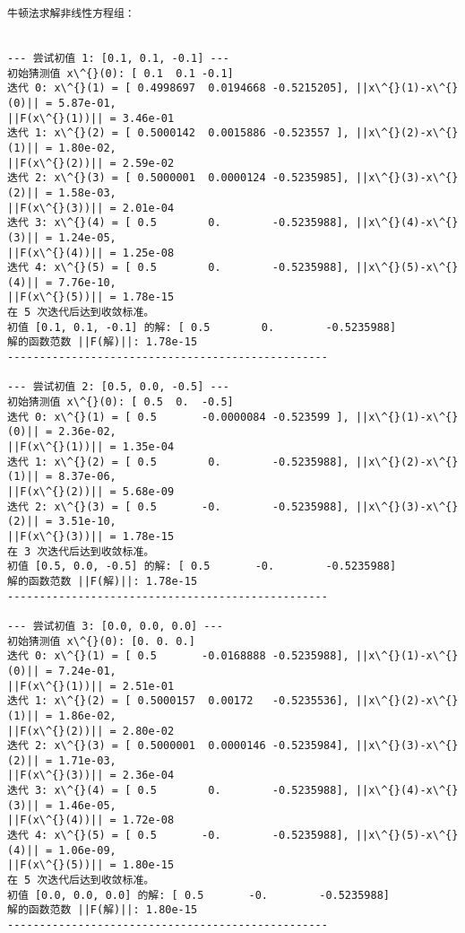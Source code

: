 \documentclass[11pt]{article}
\begin{document}
    \begin{Verbatim}[commandchars=\\\{\}]
牛顿法求解非线性方程组：


--- 尝试初值 1: [0.1, 0.1, -0.1] ---
初始猜测值 x\^{}(0): [ 0.1  0.1 -0.1]
迭代 0: x\^{}(1) = [ 0.4998697  0.0194668 -0.5215205], ||x\^{}(1)-x\^{}(0)|| = 5.87e-01,
||F(x\^{}(1))|| = 3.46e-01
迭代 1: x\^{}(2) = [ 0.5000142  0.0015886 -0.523557 ], ||x\^{}(2)-x\^{}(1)|| = 1.80e-02,
||F(x\^{}(2))|| = 2.59e-02
迭代 2: x\^{}(3) = [ 0.5000001  0.0000124 -0.5235985], ||x\^{}(3)-x\^{}(2)|| = 1.58e-03,
||F(x\^{}(3))|| = 2.01e-04
迭代 3: x\^{}(4) = [ 0.5        0.        -0.5235988], ||x\^{}(4)-x\^{}(3)|| = 1.24e-05,
||F(x\^{}(4))|| = 1.25e-08
迭代 4: x\^{}(5) = [ 0.5        0.        -0.5235988], ||x\^{}(5)-x\^{}(4)|| = 7.76e-10,
||F(x\^{}(5))|| = 1.78e-15
在 5 次迭代后达到收敛标准。
初值 [0.1, 0.1, -0.1] 的解: [ 0.5        0.        -0.5235988]
解的函数范数 ||F(解)||: 1.78e-15
--------------------------------------------------

--- 尝试初值 2: [0.5, 0.0, -0.5] ---
初始猜测值 x\^{}(0): [ 0.5  0.  -0.5]
迭代 0: x\^{}(1) = [ 0.5       -0.0000084 -0.523599 ], ||x\^{}(1)-x\^{}(0)|| = 2.36e-02,
||F(x\^{}(1))|| = 1.35e-04
迭代 1: x\^{}(2) = [ 0.5        0.        -0.5235988], ||x\^{}(2)-x\^{}(1)|| = 8.37e-06,
||F(x\^{}(2))|| = 5.68e-09
迭代 2: x\^{}(3) = [ 0.5       -0.        -0.5235988], ||x\^{}(3)-x\^{}(2)|| = 3.51e-10,
||F(x\^{}(3))|| = 1.78e-15
在 3 次迭代后达到收敛标准。
初值 [0.5, 0.0, -0.5] 的解: [ 0.5       -0.        -0.5235988]
解的函数范数 ||F(解)||: 1.78e-15
--------------------------------------------------

--- 尝试初值 3: [0.0, 0.0, 0.0] ---
初始猜测值 x\^{}(0): [0. 0. 0.]
迭代 0: x\^{}(1) = [ 0.5       -0.0168888 -0.5235988], ||x\^{}(1)-x\^{}(0)|| = 7.24e-01,
||F(x\^{}(1))|| = 2.51e-01
迭代 1: x\^{}(2) = [ 0.5000157  0.00172   -0.5235536], ||x\^{}(2)-x\^{}(1)|| = 1.86e-02,
||F(x\^{}(2))|| = 2.80e-02
迭代 2: x\^{}(3) = [ 0.5000001  0.0000146 -0.5235984], ||x\^{}(3)-x\^{}(2)|| = 1.71e-03,
||F(x\^{}(3))|| = 2.36e-04
迭代 3: x\^{}(4) = [ 0.5        0.        -0.5235988], ||x\^{}(4)-x\^{}(3)|| = 1.46e-05,
||F(x\^{}(4))|| = 1.72e-08
迭代 4: x\^{}(5) = [ 0.5       -0.        -0.5235988], ||x\^{}(5)-x\^{}(4)|| = 1.06e-09,
||F(x\^{}(5))|| = 1.80e-15
在 5 次迭代后达到收敛标准。
初值 [0.0, 0.0, 0.0] 的解: [ 0.5       -0.        -0.5235988]
解的函数范数 ||F(解)||: 1.80e-15
--------------------------------------------------
    \end{Verbatim}
\end{document}
